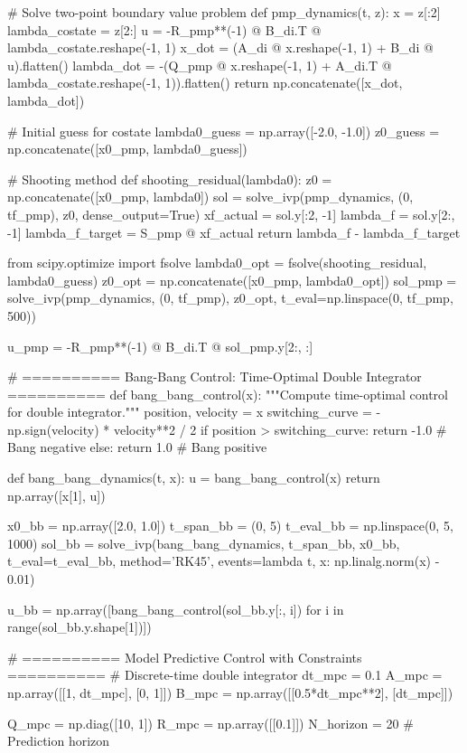 \documentclass[a4paper, 11pt]{article}
\begin{document}
\begin{pycode}
# Solve two-point boundary value problem
def pmp_dynamics(t, z):
    x = z[:2]
    lambda_costate = z[2:]
    u = -R_pmp**(-1) @ B_di.T @ lambda_costate.reshape(-1, 1)
    x_dot = (A_di @ x.reshape(-1, 1) + B_di @ u).flatten()
    lambda_dot = -(Q_pmp @ x.reshape(-1, 1) + A_di.T @ lambda_costate.reshape(-1, 1)).flatten()
    return np.concatenate([x_dot, lambda_dot])

# Initial guess for costate
lambda0_guess = np.array([-2.0, -1.0])
z0_guess = np.concatenate([x0_pmp, lambda0_guess])

# Shooting method
def shooting_residual(lambda0):
    z0 = np.concatenate([x0_pmp, lambda0])
    sol = solve_ivp(pmp_dynamics, (0, tf_pmp), z0, dense_output=True)
    xf_actual = sol.y[:2, -1]
    lambda_f = sol.y[2:, -1]
    lambda_f_target = S_pmp @ xf_actual
    return lambda_f - lambda_f_target

from scipy.optimize import fsolve
lambda0_opt = fsolve(shooting_residual, lambda0_guess)
z0_opt = np.concatenate([x0_pmp, lambda0_opt])
sol_pmp = solve_ivp(pmp_dynamics, (0, tf_pmp), z0_opt, t_eval=np.linspace(0, tf_pmp, 500))

u_pmp = -R_pmp**(-1) @ B_di.T @ sol_pmp.y[2:, :]

# ========== Bang-Bang Control: Time-Optimal Double Integrator ==========
def bang_bang_control(x):
    """Compute time-optimal control for double integrator."""
    position, velocity = x
    switching_curve = -np.sign(velocity) * velocity**2 / 2
    if position > switching_curve:
        return -1.0  # Bang negative
    else:
        return 1.0   # Bang positive

def bang_bang_dynamics(t, x):
    u = bang_bang_control(x)
    return np.array([x[1], u])

x0_bb = np.array([2.0, 1.0])
t_span_bb = (0, 5)
t_eval_bb = np.linspace(0, 5, 1000)
sol_bb = solve_ivp(bang_bang_dynamics, t_span_bb, x0_bb, t_eval=t_eval_bb,
                   method='RK45', events=lambda t, x: np.linalg.norm(x) - 0.01)

u_bb = np.array([bang_bang_control(sol_bb.y[:, i]) for i in range(sol_bb.y.shape[1])])

# ========== Model Predictive Control with Constraints ==========
# Discrete-time double integrator
dt_mpc = 0.1
A_mpc = np.array([[1, dt_mpc],
                  [0, 1]])
B_mpc = np.array([[0.5*dt_mpc**2],
                  [dt_mpc]])

Q_mpc = np.diag([10, 1])
R_mpc = np.array([[0.1]])
N_horizon = 20  # Prediction horizon


\end{pycode}
\end{document}
